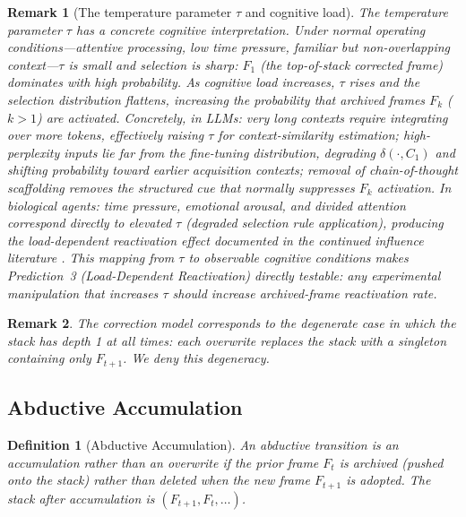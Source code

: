 \documentclass[12pt]{article}
\newtheorem{definition}{Definition}
\newtheorem{remark}{Remark}
\begin{document}
\begin{remark}[The temperature parameter $\tau$ and cognitive load]
The temperature parameter $\tau$ has a concrete cognitive interpretation.
Under normal operating conditions---attentive processing, low time pressure,
familiar but non-overlapping context---$\tau$ is small and selection is sharp:
$F_1$ (the top-of-stack corrected frame) dominates with high probability.
As cognitive load increases, $\tau$ rises and the selection distribution
flattens, increasing the probability that archived frames $F_k$ ($k > 1$)
are activated.
Concretely, in LLMs: very long contexts require integrating over more
tokens, effectively raising $\tau$ for context-similarity estimation;
high-perplexity inputs lie far from the fine-tuning distribution,
degrading $\delta(\cdot, C_1)$ and shifting probability toward earlier
acquisition contexts; removal of chain-of-thought scaffolding removes
the structured cue that normally suppresses $F_k$ activation.
In biological agents: time pressure, emotional arousal, and divided
attention correspond directly to elevated $\tau$ (degraded selection
rule application), producing the load-dependent reactivation effect
documented in the continued influence literature \cite{ecker2022}.
This mapping from $\tau$ to observable cognitive conditions makes
Prediction~3 (Load-Dependent Reactivation) directly testable:
any experimental manipulation that increases $\tau$ should increase
archived-frame reactivation rate.
\end{remark}


\begin{remark}
The correction model corresponds to the degenerate case in which
the stack has depth 1 at all times: each overwrite replaces the
stack with a singleton containing only $F_{t+1}$.
We deny this degeneracy.
\end{remark}

\subsection{Abductive Accumulation}

\begin{definition}[Abductive Accumulation]
An abductive transition is an \emph{accumulation} rather than an
overwrite if the prior frame $F_t$ is archived (pushed onto the
stack) rather than deleted when the new frame $F_{t+1}$ is adopted.
The stack after accumulation is $(F_{t+1}, F_t, \ldots)$.
\end{definition}
\end{document}
